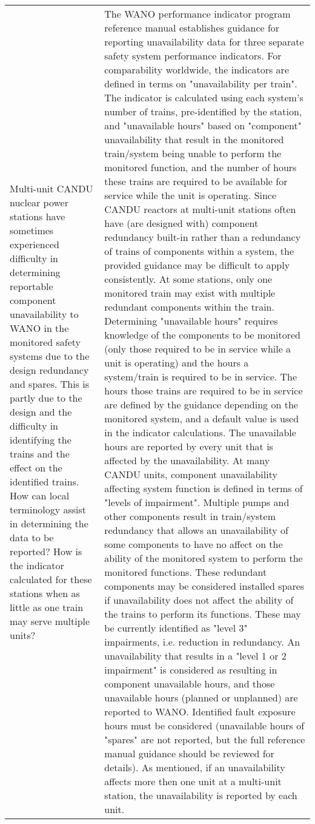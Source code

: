 \begin{longtable}{p{7cm}p{7cm}}
    Multi-unit CANDU nuclear power stations have sometimes experienced
  difficulty in determining reportable component unavailability to
  WANO in the monitored safety systems due to the design redundancy
  and spares. This is partly due to the design and the difficulty in
  identifying the trains and the effect on the identified trains. How
  can local terminology assist in determining the data to be reported?
  How is the indicator calculated for these stations when as little as
  one train may serve multiple units? &
    The WANO performance indicator program reference manual establishes guidance for reporting unavailability data for three separate safety system performance indicators. For comparability worldwide, the indicators are defined in terms on "unavailability per train". The indicator is calculated using each system's number of trains, pre-identified by the station, and "unavailable hours" based on "component" unavailability that result in the monitored train/system being unable to perform the monitored function, and the number of hours these trains are required to be available for service while the unit is operating. Since CANDU reactors at multi-unit stations often have (are designed with) component redundancy built-in rather than a redundancy of trains of components within a system, the provided guidance may be difficult to apply consistently.
    At some stations, only one monitored train may exist with multiple redundant components within the train. Determining "unavailable hours" requires knowledge of the components to be monitored (only those required to be in service while a unit is operating) and the hours a system/train is required to be in service. The hours those trains are required to be in service are defined by the guidance depending on the monitored system, and a default value is used in the indicator calculations. The unavailable hours are reported by every unit that is affected by the unavailability.
    At many CANDU units, component unavailability affecting system function is defined in terms of "levels of impairment". Multiple pumps and other components result in train/system redundancy that allows an unavailability of some components to have no affect on the ability of the monitored system to perform the monitored functions. These redundant components may be considered installed spares if unavailability does not affect the ability of the trains to perform its functions. These may be currently identified as "level 3" impairments, i.e. reduction in redundancy. An unavailability that results in a "level 1 or 2 impairment" is considered as resulting in component unavailable hours, and those unavailable hours (planned or unplanned) are reported to WANO. Identified fault exposure hours must be considered (unavailable hours of "spares" are not reported, but the full reference manual guidance should be reviewed for details). As mentioned, if an unavailability affects more then one unit at a multi-unit station, the unavailability is reported by each unit.

\end{longtable}
